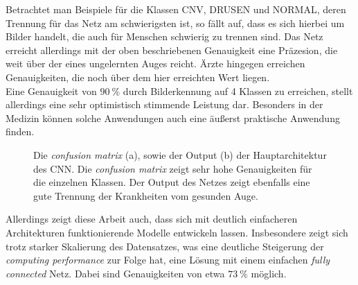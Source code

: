 %
Betrachtet man Beispiele für die Klassen CNV, DRUSEN und NORMAL, deren
Trennung für das Netz am schwierigsten ist, so fällt auf, dass es sich hierbei
um Bilder handelt, die auch für Menschen schwierig zu trennen sind. Das Netz
erreicht allerdings mit der oben beschriebenen Genauigkeit eine Präzesion, die
weit über der eines ungelernten Auges reicht. Ärzte hingegen erreichen
Genauigkeiten, die noch über dem hier erreichten Wert liegen.\\
Eine Genauigkeit von $\SI{90}{\percent}$ durch Bilderkennung auf 4 Klassen zu
erreichen, stellt allerdings eine sehr optimistisch stimmende Leistung dar.
Besonders in der Medizin können solche Anwendungen auch eine äußerst praktische
Anwendung finden.\\

%
\begin{figure}[h!]
  \caption{Die \textit{confusion matrix} (a), sowie der Output (b) der Hauptarchitektur des CNN. Die \textit{confusion matrix} zeigt sehr hohe Genauigkeiten für die einzelnen Klassen. Der Output des Netzes zeigt ebenfalls eine gute Trennung der Krankheiten vom gesunden Auge.}
  \label{fig:erg}
\end{figure}
%
Allerdings zeigt diese Arbeit auch, dass sich mit deutlich einfacheren
Architekturen funktionierende Modelle entwickeln lassen. Insbesondere zeigt
sich trotz starker Skalierung des Datensatzes, was eine deutliche Steigerung
der \textit{computing performance} zur Folge hat, eine Lösung mit einem
einfachen \textit{fully connected} Netz. Dabei sind Genauigkeiten von etwa
$\SI{73}{\percent}$ möglich.
